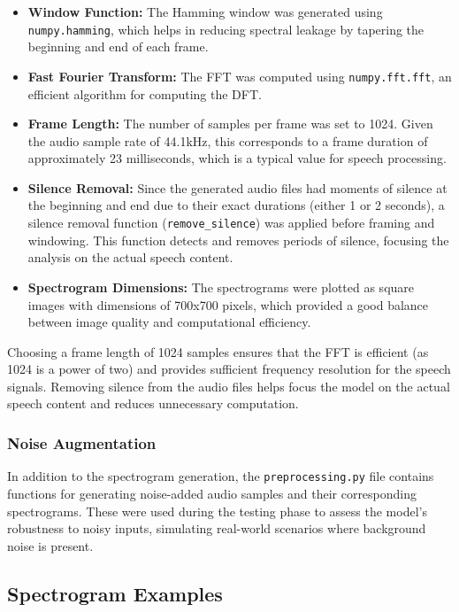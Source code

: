 \documentclass[12pt]{article}
\begin{document}
\begin{itemize}
\item \textbf{Window Function:} The Hamming window was generated using \texttt{numpy.hamming}, which helps in reducing spectral leakage by tapering the beginning and end of each frame.
\item \textbf{Fast Fourier Transform:} The FFT was computed using \texttt{numpy.fft.fft}, an efficient algorithm for computing the DFT.
\item \textbf{Frame Length:} The number of samples per frame was set to 1024. Given the audio sample rate of 44.1kHz, this corresponds to a frame duration of approximately 23 milliseconds, which is a typical value for speech processing.
\item \textbf{Silence Removal:} Since the generated audio files had moments of silence at the beginning and end due to their exact durations (either 1 or 2 seconds), a silence removal function (\verb|remove_silence|) was applied before framing and windowing. This function detects and removes periods of silence, focusing the analysis on the actual speech content.
\item \textbf{Spectrogram Dimensions:} The spectrograms were plotted as square images with dimensions of 700x700 pixels, which provided a good balance between image quality and computational efficiency.
\end{itemize}

Choosing a frame length of 1024 samples ensures that the FFT is efficient (as 1024 is a power of two) and provides sufficient frequency resolution for the speech signals. Removing silence from the audio files helps focus the model on the actual speech content and reduces unnecessary computation.

\subsubsection{Noise Augmentation}

In addition to the spectrogram generation, the \texttt{preprocessing.py} file contains functions for generating noise-added audio samples and their corresponding spectrograms. These were used during the testing phase to assess the model’s robustness to noisy inputs, simulating real-world scenarios where background noise is present.

\subsection{Spectrogram Examples}
\end{document}
